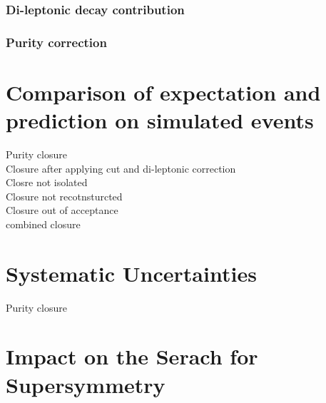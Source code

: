 \subsubsection{Di-leptonic \ttbar decay contribution}
\label{sec:Lost_Lepton_Tag_Probe}

\subsubsection{Purity correction}
\label{sec:Lost_Lepton_Tag_Probe}


\section{Comparison of expectation and prediction on simulated events}
\label{sec:Lost_Lepton_Closure}
\todo Purity closure\\
\todo Closure after applying \mt cut and di-leptonic correction\\
\todo Closre not isolated\\
\todo Closure not recotnsturcted\\
\todo Closure out of acceptance\\
\todo combined closure\\

\section{Systematic Uncertainties}
\label{sec:Lost_Lepton_Uncertainties}
\todo Purity closure\\

\section{Impact on the Serach for Supersymmetry}
\label{sec:Limits}



